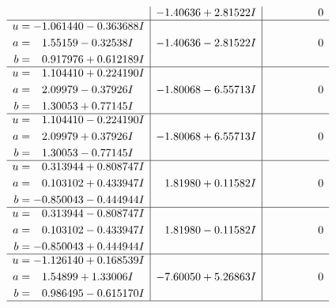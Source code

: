 \documentclass[1p]{elsarticle_modified}
\theoremstyle{definition}
\begin{document}
$$\begin{array}{c|c|c}
 & -1.40636 + 2.81522 I & \phantom{-0.000000 } 0 \\ \hline\begin{aligned}
u &= -1.061440 - 0.363688 I \\
a &= \phantom{-}1.55159 - 0.32538 I \\
b &= \phantom{-}0.917976 + 0.612189 I\end{aligned}
 & -1.40636 - 2.81522 I & \phantom{-0.000000 } 0 \\ \hline\begin{aligned}
u &= \phantom{-}1.104410 + 0.224190 I \\
a &= \phantom{-}2.09979 - 0.37926 I \\
b &= \phantom{-}1.30053 + 0.77145 I\end{aligned}
 & -1.80068 - 6.55713 I & \phantom{-0.000000 } 0 \\ \hline\begin{aligned}
u &= \phantom{-}1.104410 - 0.224190 I \\
a &= \phantom{-}2.09979 + 0.37926 I \\
b &= \phantom{-}1.30053 - 0.77145 I\end{aligned}
 & -1.80068 + 6.55713 I & \phantom{-0.000000 } 0 \\ \hline\begin{aligned}
u &= \phantom{-}0.313944 + 0.808747 I \\
a &= \phantom{-}0.103102 + 0.433947 I \\
b &= -0.850043 - 0.444944 I\end{aligned}
 & \phantom{-}1.81980 + 0.11582 I & \phantom{-0.000000 } 0 \\ \hline\begin{aligned}
u &= \phantom{-}0.313944 - 0.808747 I \\
a &= \phantom{-}0.103102 - 0.433947 I \\
b &= -0.850043 + 0.444944 I\end{aligned}
 & \phantom{-}1.81980 - 0.11582 I & \phantom{-0.000000 } 0 \\ \hline\begin{aligned}
u &= -1.126140 + 0.168539 I \\
a &= \phantom{-}1.54899 + 1.33006 I \\
b &= \phantom{-}0.986495 - 0.615170 I\end{aligned}
 & -7.60050 + 5.26863 I & \phantom{-0.000000 } 0\\
 \hline 
 \end{array}$$\newpage$$\begin{array}{c|c|c}  

\end{array}$$
\end{document}
